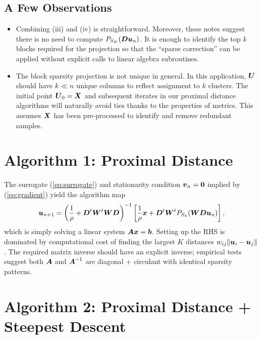 \documentclass[11pt]{article}
\begin{document}
\subsection*{A Few Observations}

\begin{itemize}
    \item Combining (iii) and (iv) is straightforward.
    Moreover, these notes suggest there is no need to compute \(P_{S_{K}}(\boldsymbol{D} \boldsymbol{u}_{n})\).
    It is enough to identify the top \(k\) blocks required for the projection so that the ``sparse correction'' can be applied without explicit calls to linear algebra subroutines.

    \item The block sparsity projection is not unique in general.
    In this application, \(\boldsymbol{U}\) should have \(k \ll n\) unique columns to reflect assignment to \(k\) clusters.
    The initial point \(\boldsymbol{U}_{0} = \boldsymbol{X}\) and subsequent iterates in our proximal distance algorithms will naturally avoid ties thanks to the properties of metrics.
    This assumes \(\boldsymbol{X}\) has been pre-processed to identify and remove redundant samples.
\end{itemize}

\section*{\center Algorithm 1: Proximal Distance}

The surrogate (\ref{eq:surrogate}) and stationarity condition \(\boldsymbol{v}_{n} = \boldsymbol{0}\) implied by (\ref{eq:gradient}) yield the algorithm map
\begin{equation*}
    \boldsymbol{u}_{n+1}
    =
    \left(\frac{1}{\rho} + \boldsymbol{D}^{t} \boldsymbol{W}^{t} \boldsymbol{W} \boldsymbol{D}\right)^{-1}
    \left[\frac{1}{\rho} \boldsymbol{x} + \boldsymbol{D}^{t} \boldsymbol{W}^{t} P_{S_{k}}(\boldsymbol{W} \boldsymbol{D} \boldsymbol{u}_{n})\right],
\end{equation*}
which is simply solving a linear system \(\boldsymbol{A} \boldsymbol{x} = \boldsymbol{b}\).
Setting up the RHS is dominated by computational cost of finding the largest \(K\) distances \(w_{ij} \| \boldsymbol{u}_{i} - \boldsymbol{u}_{j} \|\).
The required matrix inverse should have an explicit inverse; empirical tests suggest both \(\boldsymbol{A}\) and \(\boldsymbol{A}^{-1}\) are diagonal + circulant with identical sparsity patterns.

\section*{\center Algorithm 2: Proximal Distance + Steepest Descent}
\end{document}
